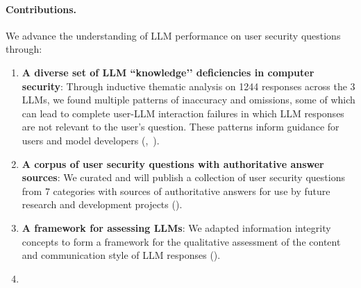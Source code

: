 \paragraph{Contributions.} We advance the understanding of LLM performance on user security questions through:
\begin{enumerate}[label={\bfseries \arabic*)}] %
    \item \textbf{A diverse set of LLM ``knowledge’’ %
   deficiencies in computer security}: Through inductive thematic analysis on 1244 responses across the 3 LLMs, we found multiple patterns of inaccuracy and omissions, some of which can lead to complete user-LLM interaction failures in which LLM responses are not relevant to the user's question. These patterns inform guidance for users and model developers (,~). %
    \item \textbf{A corpus of user security questions with authoritative answer sources}: We curated and will publish a collection of user security questions from 7 categories with sources of authoritative answers for use by future research and development projects ().
    \item \textbf{A framework for assessing LLMs}: We adapted information integrity concepts to form a framework for the qualitative assessment of the content and communication style of LLM responses ().

    \item {}
\end{enumerate}










